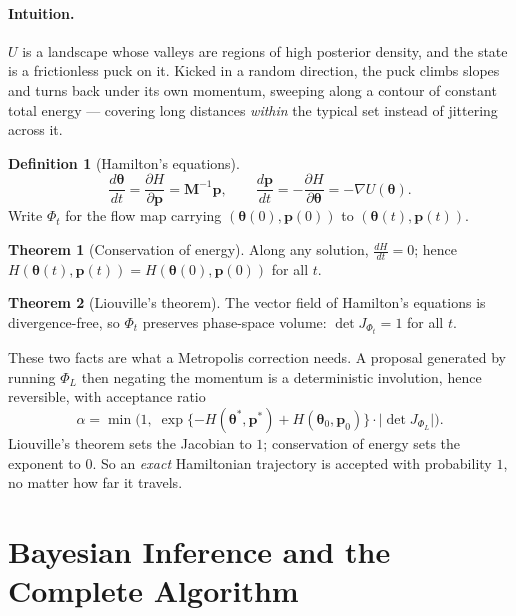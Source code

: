 \documentclass[10pt,a4paper]{article}
\theoremstyle{definition}
\newtheorem*{defn}{Definition}
\newtheorem*{thm}{Theorem}
\begin{document}
\paragraph{Intuition.} $U$ is a landscape whose valleys are regions of high
posterior density, and the state is a frictionless puck on it. Kicked in a
random direction, the puck climbs slopes and turns back under its own momentum,
sweeping along a contour of constant total energy --- covering long distances
\emph{within} the typical set instead of jittering across it.

\begin{defn}[Hamilton's equations]
\[
  \frac{d\boldsymbol{\theta}}{dt} = \frac{\partial H}{\partial \mathbf{p}}
    = \mathbf{M}^{-1}\mathbf{p},
  \qquad
  \frac{d\mathbf{p}}{dt} = -\frac{\partial H}{\partial \boldsymbol{\theta}}
    = -\nabla U(\boldsymbol{\theta}).
\]
Write $\Phi_{t}$ for the flow map carrying $(\boldsymbol{\theta}(0),
\mathbf{p}(0))$ to $(\boldsymbol{\theta}(t), \mathbf{p}(t))$.
\end{defn}

\begin{thm}[Conservation of energy]
Along any solution, $\frac{dH}{dt} = 0$; hence
$H(\boldsymbol{\theta}(t), \mathbf{p}(t)) =
 H(\boldsymbol{\theta}(0), \mathbf{p}(0))$ for all $t$.
\end{thm}

\begin{thm}[Liouville's theorem]
The vector field of Hamilton's equations is divergence-free, so $\Phi_{t}$
preserves phase-space volume: $\det J_{\Phi_{t}} = 1$ for all $t$.
\end{thm}

These two facts are what a Metropolis correction needs. A proposal generated by
running $\Phi_{L}$ then negating the momentum is a deterministic involution,
hence reversible, with acceptance ratio
\[
  \alpha = \min\!\Big(1,\;
    \exp\{-H(\boldsymbol{\theta}^{*}, \mathbf{p}^{*})
          + H(\boldsymbol{\theta}_{0}, \mathbf{p}_{0})\}
    \cdot \big|\det J_{\Phi_{L}}\big| \Big).
\]
Liouville's theorem sets the Jacobian to $1$; conservation of energy sets the
exponent to $0$. So an \emph{exact} Hamiltonian trajectory is accepted with
probability $1$, no matter how far it travels.

\section{Bayesian Inference and the Complete Algorithm}
\end{document}

